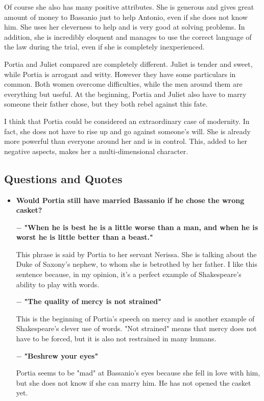\documentclass[]{article}
\begin{document}
Of course she also has many positive attributes. She is generous and gives great amount of money to Bassanio just to help Antonio, even if she does not know him. She uses her cleverness to help and is very good at solving problems. In addition, she is incredibly eloquent and manages to use the correct language of the law during the trial, even if she is completely inexperienced.

Portia and Juliet compared are completely different. Juliet is tender and sweet, while Portia is arrogant and witty. However they have some particulars in common. Both women overcome difficulties, while the men around them are everything but useful. At the beginning, Portia and Juliet also have to marry someone their father chose, but they both rebel against this fate.

I think that Portia could be considered an extraordinary case of modernity. In fact, she does not have to rise up and go against someone's will. She is already more powerful than everyone around her and is in control. This, added to her negative aspects, makes her a multi-dimensional character.

\subsection*{Questions and Quotes}
\begin{itemize}
    \item \textbf{Would Portia still have married Bassanio if he chose the wrong casket?} \par

    \item[$-$] \textbf{"When he is best he is a little worse than a man, and when he is worst he is little better than a beast."} \par
        This phrase is said by Portia to her servant Nerissa. She is talking about the Duke of Saxony’s nephew, to whom she is betrothed by her father. I like this sentence because, in my opinion, it's a perfect example of Shakespeare's ability to play with words.
    \item[$-$] \textbf{"The quality of mercy is not strained"} \par
        This is the beginning of Portia's speech on mercy and is another example of Shakespeare's clever use of words. "Not strained" means that mercy does not have to be forced, but it is also not restrained in many humans.
    \item[$-$] \textbf{"Beshrew your eyes"} \par
        Portia seems to be "mad" at Bassanio's eyes because she fell in love with him, but she does not know if she can marry him. He has not opened the casket yet.
\end{itemize}
\end{document}
